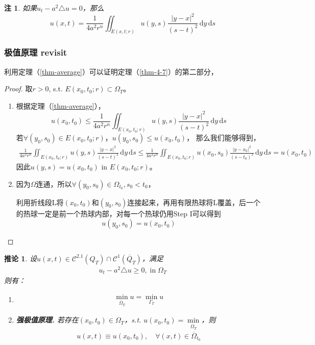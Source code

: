 \documentclass[11pt, a4paper]{article}
\theoremstyle{theorem}
\newtheorem{cor}[thm]{推论}
\newtheorem*{note}{注}
\newcommand{\intd}[1]{\,\mathrm{d}{#1}}
\begin{document}
\begin{note}
如果$u_t - a^2 \triangle u = 0$，那么
$$
u(x,t) = \frac{1}{4a^2 r^n} \iint_{E(x,t;r)} u(y,s) \frac{|y - x|^2}{(s-t)^2} \intd y \intd s
$$
\end{note}

\subsubsection{极值原理 revisit}

利用定理（\ref{thm-average}）可以证明定理（\ref{thm-4-7}）的第二部分，
\begin{proof}
取$r > 0$, s.t. $E(x_0,t_0; r) \subset \Omega_T$。
\begin{enumerate}[Step I.]
  \item 根据定理（\ref{thm-average}），
  $$
  u(x_0,t_0) \leq \frac{1}{4a^2 r^n} \iint_{E(x_0,t_0;r)} u(y,s) \frac{|y - x|^2}{(s-t)^2} \intd y \intd s
  $$
  若$\forall (y_0, s_0) \in E(x_0,t_0; r)$，$u(y_0, s_0) \leq u(x_0,t_0)$，
  那么我们能够得到，
  \begin{align}
      \frac{1}{4a^2 r^n} \iint_{E(x_0,t_0;r)} u(y,s) \frac{|y - x|^2}{(s-t)^2} \intd y \intd s \leq \frac{1}{4a^2 r^n} \iint_{E(x_0,t_0;r)} u(x_0,s_0) \frac{|y - x_0|^2}{(s-t_0)^2} \intd y \intd s = u(x_0,t_0)
  \end{align}
  因此$u(y,s) = u(x_0,t_0)$ in $E(x_0,t_0;r)$。

  \item 因为$\Omega$连通，所以$\forall (y_0,s_0) \in \Omega_{t_0}, s_0 < t_0$，

  利用折线段L将$(x_0,t_0)$和$(y_0,s_0)$连接起来，再用有限热球将L覆盖，后一个的热球一定是前一个热球内部，对每一个热球仍用Step I可以得到
  $$
  u(y_0, s_0) = u(x_0,t_0)
  $$
\end{enumerate}
\end{proof}

\begin{cor}
设$u(x,t) \in \mathcal{C}^{2.1} (Q_T) \cap \mathcal{C}^1(\overline{Q}_T)$，满足
\begin{align}
    u_t - a^2 \triangle u \geq 0, \; \text{in} \; \Omega_T
\end{align}
则有：
\begin{enumerate}[(1)]
  \item
  \begin{align}
      \min\limits_{\overline{\Omega}_T} u = \min\limits_{\Gamma_T} u
  \end{align}
  \item \textbf{强极值原理.} 若存在$(x_0,t_0) \in \Omega_T$，s.t. $u(x_0,t_0) = \min\limits_{\overline{\Omega}_T}$，则
  \begin{align}
      u(x,t) \equiv u(x_0,t_0), \quad \forall (x,t) \in \overline{\Omega}_{t_0}
  \end{align}
\end{enumerate}
\end{cor}
\end{document}
